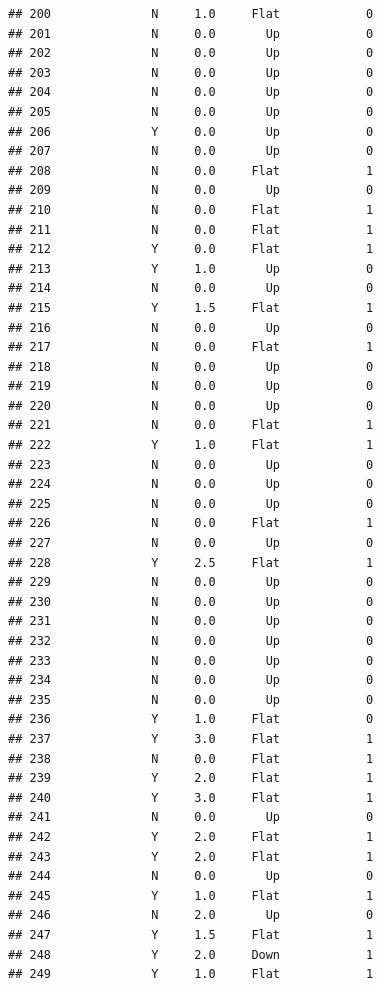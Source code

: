\documentclass[
]{article}
\begin{document}
\begin{verbatim}
## 200              N     1.0     Flat            0
## 201              N     0.0       Up            0
## 202              N     0.0       Up            0
## 203              N     0.0       Up            0
## 204              N     0.0       Up            0
## 205              N     0.0       Up            0
## 206              Y     0.0       Up            0
## 207              N     0.0       Up            0
## 208              N     0.0     Flat            1
## 209              N     0.0       Up            0
## 210              N     0.0     Flat            1
## 211              N     0.0     Flat            1
## 212              Y     0.0     Flat            1
## 213              Y     1.0       Up            0
## 214              N     0.0       Up            0
## 215              Y     1.5     Flat            1
## 216              N     0.0       Up            0
## 217              N     0.0     Flat            1
## 218              N     0.0       Up            0
## 219              N     0.0       Up            0
## 220              N     0.0       Up            0
## 221              N     0.0     Flat            1
## 222              Y     1.0     Flat            1
## 223              N     0.0       Up            0
## 224              N     0.0       Up            0
## 225              N     0.0       Up            0
## 226              N     0.0     Flat            1
## 227              N     0.0       Up            0
## 228              Y     2.5     Flat            1
## 229              N     0.0       Up            0
## 230              N     0.0       Up            0
## 231              N     0.0       Up            0
## 232              N     0.0       Up            0
## 233              N     0.0       Up            0
## 234              N     0.0       Up            0
## 235              N     0.0       Up            0
## 236              Y     1.0     Flat            0
## 237              Y     3.0     Flat            1
## 238              N     0.0     Flat            1
## 239              Y     2.0     Flat            1
## 240              Y     3.0     Flat            1
## 241              N     0.0       Up            0
## 242              Y     2.0     Flat            1
## 243              Y     2.0     Flat            1
## 244              N     0.0       Up            0
## 245              Y     1.0     Flat            1
## 246              N     2.0       Up            0
## 247              Y     1.5     Flat            1
## 248              Y     2.0     Down            1
## 249              Y     1.0     Flat            1

\end{verbatim}
\end{document}
